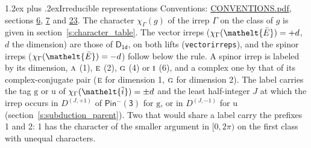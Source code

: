 \documentclass[10pt,a4paper]{article}
\makeatletter
\renewcommand\section{\@startsection{section}{1}{\z@}{-3ex plus -1ex minus -.2ex}%
  {1.2ex plus .2ex}{\normalfont\large\sffamily\bfseries\color{parttitle}}}
\numberwithin{equation}{section}
\newcommand{\eltfont}[1]{{\let\sigma\eltsigma\mathelt{#1}}}
\newcommand{\grp}[1]{\mathsf{#1}}
\newcommand{\irr}[1]{\text{\normalfont\scshape #1}}
\newcommand{\elt}[1]{\eltfont{#1}}
\newcommand{\ptag}[1]{\mathrm{#1}}
\newcommand{\irrJp}[2]{D^{(#1,#2)}}
\newcommand{\irchar}[1]{\chi_{#1}}
\newcommand{\barred}[1]{\bar{#1}}
\newcommand{\lift}[1]{\tilde{#1}}
\makeatother
\begin{document}
\section{Irreducible representations}\label{s:irreps}
Conventions: \href{../../CONVENTIONS.pdf}{CONVENTIONS.pdf}, sections \href{../../../rotation/CONVENTIONS.pdf\#conv.6}{6}, \href{../../../rotation/CONVENTIONS.pdf\#conv.7}{7} and \href{../../CONVENTIONS.pdf\#conv.23}{23}.
\leavevmode\label{n:function.character}\label{n:irrep.Gamma}The character $\irchar{\Gamma}(g)$ of the irrep $\Gamma$ on the class of $g$ is given in section~\ref{s:character_table}. \label{n:index.dimension}The vector irreps ($\irchar{\Gamma}(\elt{\barred{E}}) = +d$, $d$ the dimension) are those of \href{../../../rotation/data/pdf/D1d.pdf}{$\grp{D_{1d}}$}, on both lifts (\texttt{vectorirreps}), and the spinor irreps ($\irchar{\Gamma}(\elt{\barred{E}}) = -d$) follow below the rule. A spinor irrep is labeled by its dimension, $\irr{a}$ (1), $\irr{e}$ (2), $\irr{g}$ (4) or $\irr{i}$ (6), and a complex one by that of its complex-conjugate pair ($\irr{e}$ for dimension 1, $\irr{g}$ for dimension 2). The label carries the tag $\ptag{g}$ or $\ptag{u}$ of $\irchar{\Gamma}(\elt{\lift{i}}) = \pm d$ and the least half-integer $J$ at which the irrep occurs in $\irrJp{J}{+1}$ of $\grp{Pin^{-}(3)}$ for $\ptag{g}$, or in $\irrJp{J}{-1}$ for $\ptag{u}$ (section~\ref{s:subduction_parent}). Two that would share a label carry the prefixes 1 and 2: 1 has the character of the smaller argument in $[0, 2\pi)$ on the first class with unequal characters.
\end{document}
